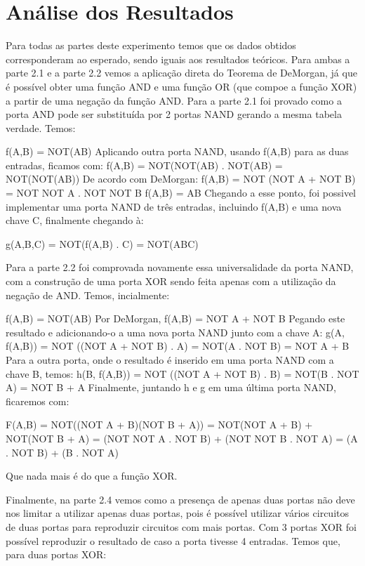 \documentclass[12pt]{article}
\begin{document}
		
	
\section{Análise dos Resultados}
\label{sec:Resultados}

Para todas as partes deste experimento temos que os dados obtidos corresponderam ao esperado, sendo iguais aos resultados teóricos.
Para ambas a parte 2.1 e a parte 2.2 vemos a aplicação direta do Teorema de DeMorgan, já que é possível obter uma função AND e uma função OR (que compoe a função XOR) a partir de uma negação da função AND.
Para a parte 2.1 foi provado como a porta AND pode ser substituída por 2 portas NAND gerando a mesma tabela verdade. Temos:

f(A,B) = NOT(AB)
Aplicando outra porta NAND, usando f(A,B) para as duas entradas, ficamos com:
f(A,B) = NOT(NOT(AB) . NOT(AB) = NOT(NOT(AB))
De acordo com DeMorgan:
f(A,B) = NOT (NOT A + NOT B) = NOT NOT A . NOT NOT B
f(A,B) = AB
Chegando a esse ponto, foi possivel implementar uma porta NAND de três entradas, incluindo f(A,B) e uma nova chave C, finalmente chegando à:

g(A,B,C) = NOT(f(A,B) . C) = NOT(ABC)

Para a parte 2.2 foi comprovada novamente essa universalidade da porta NAND, com a construção de uma porta XOR sendo feita apenas com a utilização da negação de AND. Temos, incialmente:

f(A,B) = NOT(AB) 
Por DeMorgan, f(A,B) = NOT A + NOT B 
Pegando este resultado e adicionando-o a uma nova porta NAND junto com a chave A:
g(A, f(A,B)) = NOT ((NOT A + NOT B) . A) = NOT(A . NOT B) = NOT A + B
Para a outra porta, onde o resultado é inserido em uma porta NAND com a chave B, temos:
h(B, f(A,B)) = NOT ((NOT A + NOT B) . B) = NOT(B . NOT A) = NOT B + A
Finalmente, juntando h e g em uma última porta NAND, ficaremos com:

F(A,B) = NOT((NOT A + B)(NOT B + A)) = NOT(NOT A + B) + NOT(NOT B + A)
= (NOT NOT A . NOT B) + (NOT NOT B . NOT A) = (A . NOT B) + (B . NOT A)

Que nada mais é do que a função XOR. 

Finalmente, na parte 2.4 vemos como a presença de apenas duas portas não deve nos limitar a utilizar apenas duas portas, pois é possível utilizar vários circuitos de duas portas para reproduzir circuitos com mais portas. Com 3 portas XOR foi possível reproduzir o resultado de caso a porta tivesse 4 entradas. Temos que, para duas portas XOR:
\end{document}
